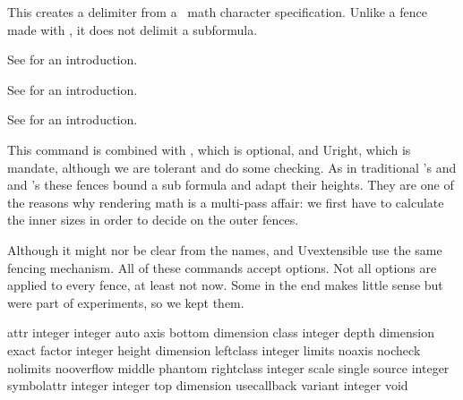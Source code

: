 \startnewprimitive[title={\prm {Udelimiter}}]

This creates a delimiter from a \UNICODE\ math character specification. Unlike a
fence made with , it does not delimit a subformula.

\stopnewprimitive

\startnewprimitive[title={\prm {Udelimiterover}}]

See  for an introduction.

\stopnewprimitive

\startnewprimitive[title={\prm {Udelimiterunder}}]

See  for an introduction.

\stopnewprimitive

\startnewprimitive[title={\prm {Uhextensible}}]

See  for an introduction.

\stopnewprimitive

\startnewprimitive[title={\prm {Uleft}}]

This command is combined with , which is optional, and \prm
{Uright}, which is mandate, although we are tolerant and do some checking. As in
traditional \TEX's  and  and \ETEX's  these
fences bound a sub formula and adapt their heights. They are one of the reasons
why rendering math is a multi-pass affair: we first have to calculate the inner
sizes in order to decide on the outer fences.

Although it might nor be clear from the names,  and \prm
{Uvextensible} use the same fencing mechanism. All of these  commands
accept options. Not all options are applied to every fence, at least not now.
Some in the end makes little sense but were part of experiments, so we kept them.

\starttabulate[|Tl|l|l|]
\NC attr       \NC integer integer \NC \NC \NR
\NC auto       \NC                 \NC \NC \NR
\NC axis       \NC                 \NC \NC \NR
\NC bottom     \NC dimension       \NC \NC \NR
\NC class      \NC integer         \NC \NC \NR
\NC depth      \NC dimension       \NC \NC \NR
\NC exact      \NC                 \NC \NC \NR
\NC factor     \NC integer         \NC \NC \NR
\NC height     \NC dimension       \NC \NC \NR
\NC leftclass  \NC integer         \NC \NC \NR
\NC limits     \NC                 \NC \NC \NR
\NC noaxis     \NC                 \NC \NC \NR
\NC nocheck    \NC                 \NC \NC \NR
\NC nolimits   \NC                 \NC \NC \NR
\NC nooverflow \NC                 \NC \NC \NR
\NC middle     \NC                 \NC \NC \NR
\NC phantom    \NC                 \NC \NC \NR
\NC rightclass \NC integer         \NC \NC \NR
\NC scale      \NC                 \NC \NC \NR
\NC single     \NC                 \NC \NC \NR
\NC source     \NC integer         \NC \NC \NR
\NC symbolattr \NC integer integer \NC \NC \NR
\NC top        \NC dimension       \NC \NC \NR
\NC usecallback\NC                 \NC \NC \NR
\NC variant    \NC integer         \NC \NC \NR
\NC void       \NC                 \NC \NC \NR
\stoptabulate


